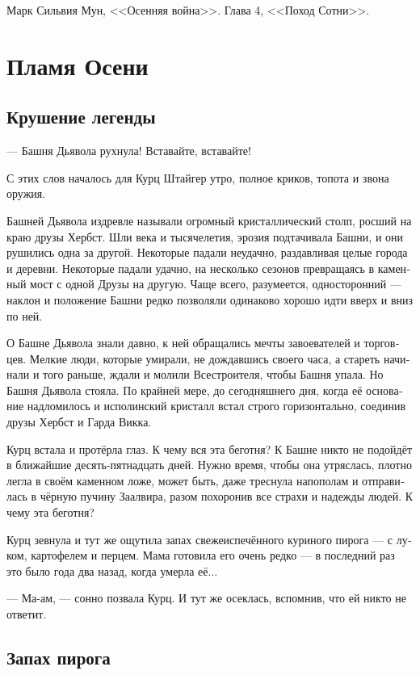 \documentclass[a4paper,12pt,fleqn]{book}\usepackage{cooltooltips}\usepackage{polyglossia}\setdefaultlanguage[babelshorthands=true]{russian}\setotherlanguage{english}\defaultfontfeatures{Ligatures=TeX,Mapping=tex-text} \usepackage{xcolor}\definecolor{lightgray}{HTML}{bbbbbb}\color{lightgray}\newcommand{\ml}[3]{\textenglish{\textcolor{black}{#3}}}
\begin{document}
Марк Сильвия Мун, <<Осенняя война>>.
Глава 4, <<Поход Сотни>>.


\chapter{Пламя Осени}

\section{Крушение легенды}

--- Башня Дьявола рухнула!
Вставайте, вставайте!

С этих слов началось для Курц Штайгер утро, полное криков, топота и звона оружия.

Башней Дьявола издревле называли огромный кристаллический столп, росший на краю друзы Хербст.
Шли века и тысячелетия, эрозия подтачивала Башни, и они рушились одна за другой.
Некоторые падали неудачно, раздавливая целые города и деревни.
Некоторые падали удачно, на несколько сезонов превращаясь в каменный мост с одной Друзы на другую.
Чаще всего, разумеется, односторонний --- наклон и положение Башни редко позволяли одинаково хорошо идти вверх и вниз по ней.

О Башне Дьявола знали давно, к ней обращались мечты завоевателей и торговцев.
Мелкие люди, которые умирали, не дождавшись своего часа, а стареть начинали и того раньше, ждали и молили Всестроителя, чтобы Башня упала.
Но Башня Дьявола стояла.
По крайней мере, до сегодняшнего дня, когда её основание надломилось и исполинский кристалл встал строго горизонтально, соединив друзы Хербст и Гарда Викка.

Курц встала и протёрла глаз.
К чему вся эта беготня?
К Башне никто не подойдёт в ближайшие десять-пятнадцать дней.
Нужно время, чтобы она утряслась, плотно легла в своём каменном ложе, может быть, даже треснула напополам и отправилась в чёрную пучину Заалвира, разом похоронив все страхи и надежды людей.
К чему эта беготня?

Курц зевнула и тут же ощутила запах свежеиспечённого куриного пирога --- с луком, картофелем и перцем.
Мама готовила его очень редко --- в последний раз это было года два назад, когда умерла её...

--- Ма-ам, --- сонно позвала Курц.
И тут же осеклась, вспомнив, что ей никто не ответит.

\section{Запах пирога}
\end{document}
